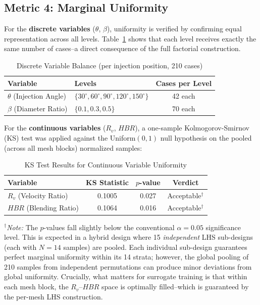 \documentclass[12pt, a4paper]{report}
\begin{document}
\subsection{Metric 4: Marginal Uniformity}
For the \textbf{discrete variables} ($\theta$, $\beta$), uniformity is verified by confirming equal representation across all levels. Table~\ref{tab:discrete_balance} shows that each level receives exactly the same number of cases--a direct consequence of the full factorial construction.

\begin{table}[H]
\centering
\caption{Discrete Variable Balance (per injection position, 210 cases)}
\label{tab:discrete_balance}
\begin{tabular}{@{}llc@{}}
\toprule
\textbf{Variable} & \textbf{Levels} & \textbf{Cases per Level} \\ \midrule
$\theta$ (Injection Angle) & $\{30^\circ, 60^\circ, 90^\circ, 120^\circ, 150^\circ\}$ & 42 each \\
$\beta$ (Diameter Ratio) & $\{0.1, 0.3, 0.5\}$ & 70 each \\
\bottomrule
\end{tabular}
\end{table}

\noindent For the \textbf{continuous variables} ($R_v$, $HBR$), a one-sample Kolmogorov-Smirnov (KS) test was applied against the Uniform$(0, 1)$ null hypothesis on the pooled (across all mesh blocks) normalized samples:

\begin{table}[H]
\centering
\caption{KS Test Results for Continuous Variable Uniformity}
\label{tab:ks_results}
\begin{tabular}{@{}lccc@{}}
\toprule
\textbf{Variable} & \textbf{KS Statistic} & \textbf{$p$-value} & \textbf{Verdict} \\ \midrule
$R_v$ (Velocity Ratio) & 0.1005 & 0.027 & Acceptable$^\dag$ \\
$HBR$ (Blending Ratio) & 0.1064 & 0.016 & Acceptable$^\dag$ \\
\bottomrule
\end{tabular}
\end{table}

\noindent $^\dag$\textit{Note:} The $p$-values fall slightly below the conventional $\alpha = 0.05$ significance level. This is expected in a hybrid design where 15 \textit{independent} LHS sub-designs (each with $N = 14$ samples) are pooled. Each individual sub-design guarantees perfect marginal uniformity within its 14 strata; however, the global pooling of 210 samples from independent permutations can produce minor deviations from global uniformity. Crucially, what matters for surrogate training is that within each mesh block, the $R_v$--$HBR$ space is optimally filled--which is guaranteed by the per-mesh LHS construction.
\end{document}
